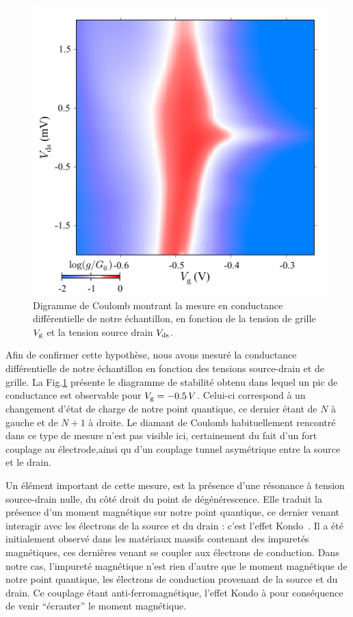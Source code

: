 \begin{figure}
\parbox{7cm}{
\includegraphics[scale=0.45]{Resultats/CoulombMap/CoulombMap.pdf} 
}
\parbox{6.5cm}{\caption{Digramme de Coulomb montrant la mesure en conductance différentielle de notre échantillon, en fonction de la tension de grille $V_{\rm{g}}$ et la tension source drain $V_{\rm{ds}}$.}
\label{coulomb_map}
}
\end{figure}

Afin de confirmer cette hypothèse, nous avons mesuré la conductance différentielle de notre échantillon en fonction des tensions source-drain et de grille. La Fig.\ref{coulomb_map} présente le diagramme de stabilité obtenu dans lequel un pic de conductance est observable pour $V_{\rm{g}}=-0.5\,V$. Celui-ci correspond à un changement d'état de charge de notre point quantique, ce dernier étant de $N$ à gauche et de $N+1$ à droite. Le diamant de Coulomb habituellement rencontré dans ce type de mesure n'est pas visible ici, certainement du fait d'un fort couplage au électrode,ainsi qu d'un couplage tunnel asymétrique entre la source et le drain.

Un élément important de cette mesure, est la présence d'une résonance à tension source-drain nulle, du côté droit du point de dégénérescence. Elle traduit la présence d'un moment magnétique sur notre point quantique, ce dernier venant interagir avec les électrons de la source et du drain : c'est l'effet Kondo~\cite{Kondo1964,Wilson1975,Goldhaber-Gordon1998}.
 Il a été initialement observé dans les matériaux massifs contenant des impuretés magnétiques, ces dernières venant se coupler aux électrons de conduction. Dans notre cas, l'impureté magnétique n'est rien d'autre que le moment magnétique de notre point quantique, les électrons de conduction provenant de la source et du drain. Ce couplage étant anti-ferromagnétique, l'effet Kondo à pour conséquence de venir ``écranter'' le moment magnétique.


